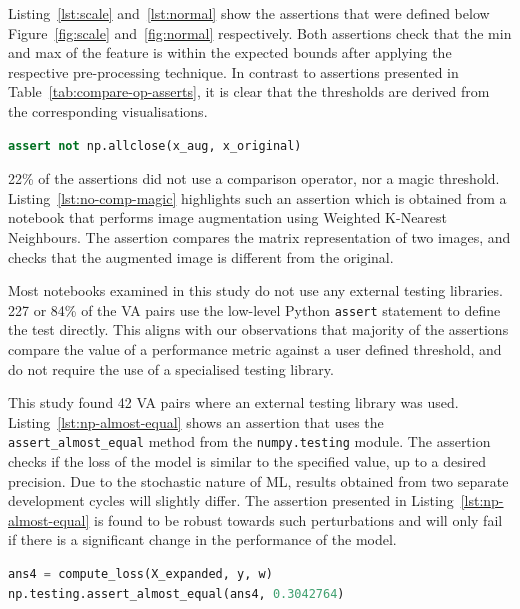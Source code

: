 \documentclass[conference]{IEEEtran}
\begin{document}
Listing~\ref{lst:scale} and~\ref{lst:normal} show the assertions that were defined below Figure~\ref{fig:scale} and~\ref{fig:normal} respectively. Both assertions check that the min and max of the feature is within the expected bounds after applying the respective pre-processing technique. In contrast to assertions presented in Table~\ref{tab:compare-op-asserts}, it is clear that the thresholds are derived from the corresponding visualisations.

\begin{lstlisting}[language=Python, caption={Assertion to check that an augmented image is different from the original.}, label={lst:no-comp-magic}]
assert not np.allclose(x_aug, x_original)
\end{lstlisting}

22\% of the assertions did not use a comparison operator, nor a magic threshold. Listing~\ref{lst:no-comp-magic} highlights such an assertion which is obtained from a notebook that performs image augmentation using Weighted K-Nearest Neighbours. The assertion compares the matrix representation of two images, and checks that the augmented image is different from the original.

Most notebooks examined in this study do not use any external testing libraries. 227 or 84\% of the VA pairs use the low-level Python \texttt{assert} statement to define the test directly. This aligns with our observations that majority of the assertions compare the value of a performance metric against a user defined threshold, and do not require the use of a specialised testing library. 

This study found 42 VA pairs where an external testing library was used. Listing~\ref{lst:np-almost-equal} shows an assertion that uses the \texttt{assert\_almost\_equal} method from the \texttt{numpy.testing} module. The assertion checks if the loss of the model is similar to the specified value, up to a desired precision. Due to the stochastic nature of ML, results obtained from two separate development cycles will slightly differ. The assertion presented in Listing~\ref{lst:np-almost-equal} is found to be robust towards such perturbations and will only fail if there is a significant change in the performance of the model.

\begin{lstlisting}[language=Python, caption={Assertion to check that the loss of the model is similar to the specified value.}, label={lst:np-almost-equal}]
ans4 = compute_loss(X_expanded, y, w)
np.testing.assert_almost_equal(ans4, 0.3042764) 
\end{lstlisting}
\end{document}

